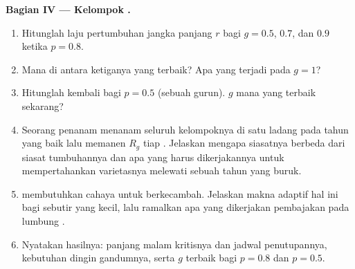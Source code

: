 \begin{problem}
\medskip
\noindent\textbf{Bagian IV --- Kelompok .}
\begin{enumerate}[resume]
  \item Hitunglah laju pertumbuhan jangka panjang $r$ bagi $g = 0.5$,
        $0.7$, dan $0.9$ ketika $p = 0.8$.
  \item Mana di antara ketiganya yang terbaik? Apa yang terjadi pada
        $g = 1$?
  \item Hitunglah kembali bagi $p = 0.5$ (sebuah gurun). $g$ mana yang
        terbaik sekarang?
  \item Seorang penanam menanam seluruh kelompoknya di satu ladang
        pada tahun yang baik lalu memanen $R_g$ tiap . Jelaskan
        mengapa siasatnya berbeda dari siasat tumbuhannya dan apa yang
        harus dikerjakannya untuk mempertahankan varietasnya melewati
        sebuah tahun yang buruk.
  \item {} membutuhkan cahaya untuk berkecambah. Jelaskan makna
        adaptif hal ini bagi sebutir  yang kecil, lalu ramalkan apa
        yang dikerjakan pembajakan pada lumbung .
  \item Nyatakan hasilnya: panjang malam kritisnya dan jadwal
        penutupannya, kebutuhan dingin gandumnya, serta $g$ terbaik
        bagi $p = 0.8$ dan $p = 0.5$.
\end{enumerate}
\end{problem}
